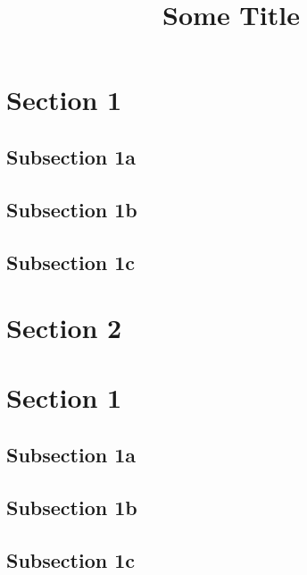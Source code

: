 \documentclass{beamer}
\title{Some Title}
\begin{document}
\begin{frame}
  \tableofcontents
\end{frame}

\section{Section 1}
\subsection{Subsection 1a}
\frame{}
\subsection{Subsection 1b}
\frame{}
\subsection{Subsection 1c}
\frame{}

\section{Section 2}
\frame{}

\section{Section 1}
\subsection{Subsection 1a}
\frame{}
\subsection{Subsection 1b}
\frame{}
\subsection{Subsection 1c}
\frame{}
\end{document}

